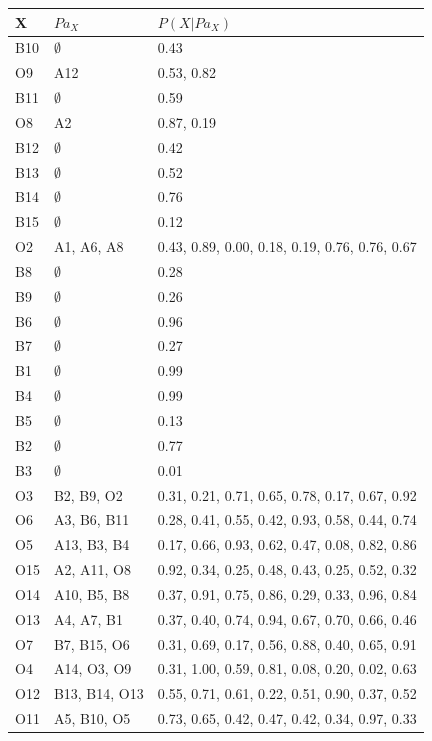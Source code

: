 \documentclass{article}
\newcommand{\Pa}{\mathit{Pa}}
\begin{document}
		\begin{table}[h]
			\centering
			\begin{tabular}{@{}llp{6cm}@{}}
				X & $\Pa_X$ & $P(X | \Pa_X)$ \\
				\midrule
				B10 & $\emptyset$ & 0.43 \\
				O9 & A12 & 0.53, 0.82 \\
				B11 & $\emptyset$ & 0.59 \\
				O8 & A2 & 0.87, 0.19 \\
				B12 & $\emptyset$ & 0.42 \\
				B13 & $\emptyset$ & 0.52 \\
				B14 & $\emptyset$ & 0.76 \\
				B15 & $\emptyset$ & 0.12 \\
				O2 & A1, A6, A8 & 0.43, 0.89, 0.00, 0.18, 0.19, 0.76, 0.76, 0.67 \\
				B8 & $\emptyset$ & 0.28 \\
				B9 & $\emptyset$ & 0.26 \\
				B6 & $\emptyset$ & 0.96 \\
				B7 & $\emptyset$ & 0.27 \\
				B1 & $\emptyset$ & 0.99 \\
				B4 & $\emptyset$ & 0.99 \\
				B5 & $\emptyset$ & 0.13 \\
				B2 & $\emptyset$ & 0.77 \\
				B3 & $\emptyset$ & 0.01 \\
				O3 & B2, B9, O2 & 0.31, 0.21, 0.71, 0.65, 0.78, 0.17, 0.67, 0.92 \\
				O6 & A3, B6, B11 & 0.28, 0.41, 0.55, 0.42, 0.93, 0.58, 0.44, 0.74 \\
				O5 & A13, B3, B4 & 0.17, 0.66, 0.93, 0.62, 0.47, 0.08, 0.82, 0.86 \\
				O15 & A2, A11, O8 & 0.92, 0.34, 0.25, 0.48, 0.43, 0.25, 0.52, 0.32 \\
				O14 & A10, B5, B8 & 0.37, 0.91, 0.75, 0.86, 0.29, 0.33, 0.96, 0.84 \\
				O13 & A4, A7, B1 & 0.37, 0.40, 0.74, 0.94, 0.67, 0.70, 0.66, 0.46 \\
				O7 & B7, B15, O6 & 0.31, 0.69, 0.17, 0.56, 0.88, 0.40, 0.65, 0.91 \\
				O4 & A14, O3, O9 & 0.31, 1.00, 0.59, 0.81, 0.08, 0.20, 0.02, 0.63 \\
				O12 & B13, B14, O13 & 0.55, 0.71, 0.61, 0.22, 0.51, 0.90, 0.37, 0.52 \\
				O11 & A5, B10, O5 & 0.73, 0.65, 0.42, 0.47, 0.42, 0.34, 0.97, 0.33 \\

\end{tabular}
\end{table}
\end{document}
